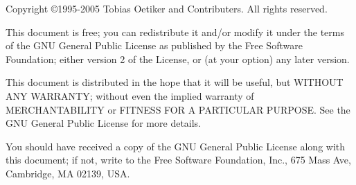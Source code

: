 
\ifx\pdfoutput\undefined %
\else
{}
\fi
\newlength{\centeroffset}
\setlength{\centeroffset}{-0.5\oddsidemargin}
\addtolength{\centeroffset}{0.5\evensidemargin}
\thispagestyle{empty}
\noindent\hspace*{\centeroffset}

\noindent\hspace*{\centeroffset}



\pagebreak
\begin{small} 
  Copyright \copyright 1995-2005 Tobias Oetiker and Contributers.  All rights reserved.
 
  This document is free; you can redistribute it and/or modify it
  under the terms of the GNU General Public License as published by
  the Free Software Foundation; either version 2 of the License, or
  (at your option) any later version.
  
  This document is distributed in the hope that it will be useful, but
  WITHOUT ANY WARRANTY; without even the implied warranty of
  MERCHANTABILITY or FITNESS FOR A PARTICULAR PURPOSE\@.  See the GNU
  General Public License for more details.
  
  You should have received a copy of the GNU General Public License
  along with this document; if not, write to the Free Software
  Foundation, Inc., 675 Mass Ave, Cambridge, MA 02139, USA.

\end{small}


\endinput

%


